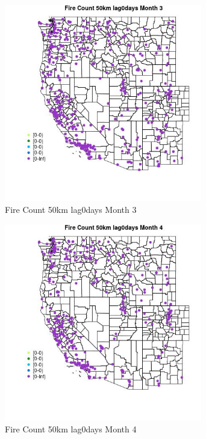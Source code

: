 \begin{figure} 
\centering  
\includegraphics[width=0.77\textwidth]{Code_Outputs/Report_ML_input_PM25_Step4_part_e_de_duplicated_aves_compiled_2019-05-18wNAs_MapObsMo3Fire_Count_50km_lag0days.jpg} 
\caption{\label{fig:Report_ML_input_PM25_Step4_part_e_de_duplicated_aves_compiled_2019-05-18wNAsMapObsMo3Fire_Count_50km_lag0days}Fire Count 50km lag0days Month 3} 
\end{figure} 
 

\clearpage 

\begin{figure} 
\centering  
\includegraphics[width=0.77\textwidth]{Code_Outputs/Report_ML_input_PM25_Step4_part_e_de_duplicated_aves_compiled_2019-05-18wNAs_MapObsMo4Fire_Count_50km_lag0days.jpg} 
\caption{\label{fig:Report_ML_input_PM25_Step4_part_e_de_duplicated_aves_compiled_2019-05-18wNAsMapObsMo4Fire_Count_50km_lag0days}Fire Count 50km lag0days Month 4} 
\end{figure} 
 

